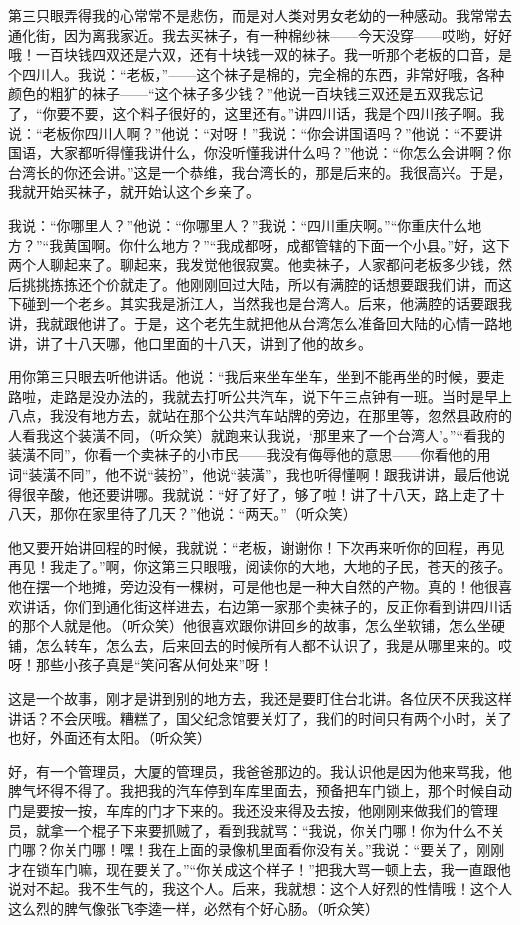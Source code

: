 \par 第三只眼弄得我的心常常不是悲伤，而是对人类对男女老幼的一种感动。我常常去通化街，因为离我家近。我去买袜子，有一种棉纱袜——今天没穿——哎哟，好好哦！一百块钱四双还是六双，还有十块钱一双的袜子。我一听那个老板的口音，是个四川人。我说：“老板，”——这个袜子是棉的，完全棉的东西，非常好哦，各种颜色的粗犷的袜子——“这个袜子多少钱？”他说一百块钱三双还是五双我忘记了，“你要不要，这个料子很好的，这里还有。”讲四川话，我是个四川孩子啊。我说：“老板你四川人啊？”他说：“对呀！”我说：“你会讲国语吗？”他说：“不要讲国语，大家都听得懂我讲什么，你没听懂我讲什么吗？”他说：“你怎么会讲啊？你台湾长的你还会讲。”这是一个恭维，我台湾长的，那是后来的。我很高兴。于是，我就开始买袜子，就开始认这个乡亲了。
\par 我说：“你哪里人？”他说：“你哪里人？”我说：“四川重庆啊。”“你重庆什么地方？”“我黄国啊。你什么地方？”“我成都呀，成都管辖的下面一个小县。”好，这下两个人聊起来了。聊起来，我发觉他很寂寞。他卖袜子，人家都问老板多少钱，然后挑挑拣拣还个价就走了。他刚刚回过大陆，所以有满腔的话想要跟我们讲，而这下碰到一个老乡。其实我是浙江人，当然我也是台湾人。后来，他满腔的话要跟我讲，我就跟他讲了。于是，这个老先生就把他从台湾怎么准备回大陆的心情一路地讲，讲了十八天哪，他口里面的十八天，讲到了他的故乡。
\par 用你第三只眼去听他讲话。他说：“我后来坐车坐车，坐到不能再坐的时候，要走路啦，走路是没办法的，我就去打听公共汽车，说下午三点钟有一班。当时是早上八点，我没有地方去，就站在那个公共汽车站牌的旁边，在那里等，忽然县政府的人看我这个装潢不同，（听众笑）就跑来认我说，‘那里来了一个台湾人’。”“看我的装潢不同”，你看一个卖袜子的小市民——我没有侮辱他的意思——你看他的用词“装潢不同”，他不说“装扮”，他说“装潢”，我也听得懂啊！跟我讲讲，最后他说得很辛酸，他还要讲哪。我就说：“好了好了，够了啦！讲了十八天，路上走了十八天，那你在家里待了几天？”他说：“两天。”（听众笑）
\par 他又要开始讲回程的时候，我就说：“老板，谢谢你！下次再来听你的回程，再见再见！我走了。”啊，你这第三只眼哦，阅读你的大地，大地的子民，苍天的孩子。他在摆一个地摊，旁边没有一棵树，可是他也是一种大自然的产物。真的！他很喜欢讲话，你们到通化街这样进去，右边第一家那个卖袜子的，反正你看到讲四川话的那个人就是他。（听众笑）他很喜欢跟你讲回乡的故事，怎么坐软铺，怎么坐硬铺，怎么转车，怎么去，后来回去的时候所有人都不认识了，我是从哪里来的。哎呀！那些小孩子真是“笑问客从何处来”呀！
\par 这是一个故事，刚才是讲到别的地方去，我还是要盯住台北讲。各位厌不厌我这样讲话？不会厌哦。糟糕了，国父纪念馆要关灯了，我们的时间只有两个小时，关了也好，外面还有太阳。（听众笑）
\par 好，有一个管理员，大厦的管理员，我爸爸那边的。我认识他是因为他来骂我，他脾气坏得不得了。我把我的汽车停到车库里面去，预备把车门锁上，那个时候自动门是要按一按，车库的门才下来的。我还没来得及去按，他刚刚来做我们的管理员，就拿一个棍子下来要抓贼了，看到我就骂：“我说，你关门哪！你为什么不关门哪？你关门哪！嘿！我在上面的录像机里面看你没有关。”我说：“要关了，刚刚才在锁车门嘛，现在要关了。”“你关成这个样子！”把我大骂一顿上去，我一直跟他说对不起。我不生气的，我这个人。后来，我就想：这个人好烈的性情哦！这个人这么烈的脾气像张飞李逵一样，必然有个好心肠。（听众笑）
